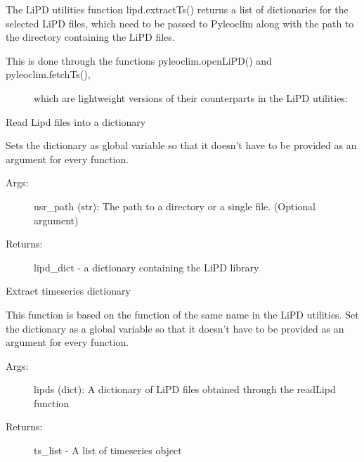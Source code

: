 \documentclass[letterpaper,10pt,english]{sphinxmanual}
\begin{document}
The LiPD utilities function lipd.extractTs() returns a list of dictionaries for
the selected LiPD files, which need to be passed to Pyleoclim along with the path
to the directory containing the LiPD files.
\begin{description}
\item[{This is done through the functions pyleoclim.openLiPD() and pyleoclim.fetchTs(),}] \leavevmode
which are lightweight versions of their counterparts in the LiPD utilities:

\end{description}

\begin{fulllineitems}
\label{\detokenize{Main:pyleoclim.openLipd}}
Read Lipd files into a dictionary

Sets the dictionary as global variable so that it doesn’t have to be provided
as an argument for every function.
\begin{description}
\item[{Args:}] \leavevmode
usr\_path (str): The path to a directory or a single file. (Optional argument)

\item[{Returns:}] \leavevmode
lipd\_dict - a dictionary containing the LiPD library

\end{description}

\end{fulllineitems}


\begin{fulllineitems}
\label{\detokenize{Main:pyleoclim.fetchTs}}
Extract timeseries dictionary

This function is based on the function of the same name in the LiPD utilities.
Set the dictionary as a global variable so that it doesn’t have to be
provided as an argument for every function.
\begin{description}
\item[{Args:}] \leavevmode
lipds (dict): A dictionary of LiPD files obtained through the
readLipd function

\item[{Returns:}] \leavevmode
ts\_list - A list of timeseries object

\end{description}

\end{fulllineitems}
\end{document}
